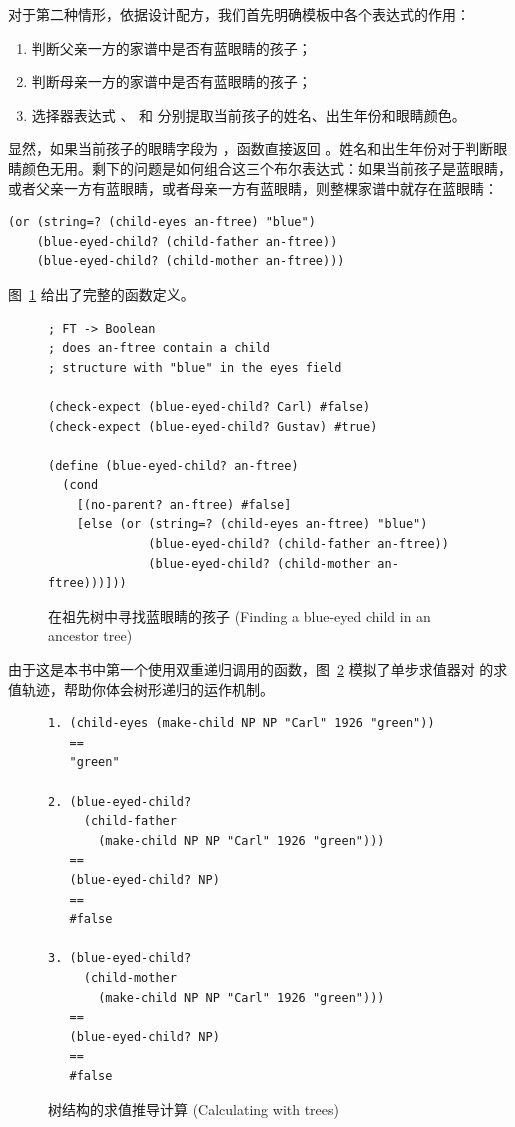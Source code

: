 对于第二种情形，依据设计配方，我们首先明确模板中各个表达式的作用：
\begin{enumerate}
  \item {} 判断父亲一方的家谱中是否有蓝眼睛的孩子；
  \item {} 判断母亲一方的家谱中是否有蓝眼睛的孩子；
  \item 选择器表达式 、 和  分别提取当前孩子的姓名、出生年份和眼睛颜色。
\end{enumerate}

显然，如果当前孩子的眼睛字段为 ，函数直接返回 。姓名和出生年份对于判断眼睛颜色无用。剩下的问题是如何组合这三个布尔表达式：如果当前孩子是蓝眼睛，或者父亲一方有蓝眼睛，或者母亲一方有蓝眼睛，则整棵家谱中就存在蓝眼睛：

\begin{lstlisting}[language=BSL]
(or (string=? (child-eyes an-ftree) "blue")
    (blue-eyed-child? (child-father an-ftree))
    (blue-eyed-child? (child-mother an-ftree)))
\end{lstlisting}

图~\ref{fig:113} 给出了完整的函数定义。

\begin{figure}[htbp]
  \centering
\begin{lstlisting}[language=BSL, basicstyle=\scriptsize\ttfamily]
; FT -> Boolean
; does an-ftree contain a child
; structure with "blue" in the eyes field

(check-expect (blue-eyed-child? Carl) #false)
(check-expect (blue-eyed-child? Gustav) #true)

(define (blue-eyed-child? an-ftree)
  (cond
    [(no-parent? an-ftree) #false]
    [else (or (string=? (child-eyes an-ftree) "blue")
              (blue-eyed-child? (child-father an-ftree))
              (blue-eyed-child? (child-mother an-ftree)))]))
\end{lstlisting}
  \caption{在祖先树中寻找蓝眼睛的孩子 (Finding a blue-eyed child in an ancestor tree)}
  \label{fig:113}
\end{figure}

由于这是本书中第一个使用双重递归调用的函数，图~\ref{fig:114} 模拟了单步求值器对  的求值轨迹，帮助你体会树形递归的运作机制。

\begin{figure}[htbp]
  \centering
\begin{lstlisting}[language=BSL, basicstyle=\scriptsize\ttfamily]
1. (child-eyes (make-child NP NP "Carl" 1926 "green"))
   ==
   "green"

2. (blue-eyed-child?
     (child-father
       (make-child NP NP "Carl" 1926 "green")))
   ==
   (blue-eyed-child? NP)
   ==
   #false

3. (blue-eyed-child?
     (child-mother
       (make-child NP NP "Carl" 1926 "green")))
   ==
   (blue-eyed-child? NP)
   ==
   #false
\end{lstlisting}
  \caption{树结构的求值推导计算 (Calculating with trees)}
  \label{fig:114}
\end{figure}

